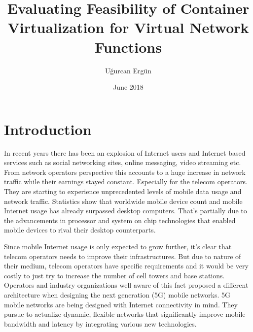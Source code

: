 \documentclass[12pt,oneandhalf,chaparabic,ceng,ms,eng,oneside,pntc]{gsufbe}
\author{Uğurcan Ergün}
\title{Evaluating Feasibility of Container Virtualization for Virtual Network Functions}
\date{June 2018}
\begin{document}
\addtolength{\textheight}{1.5cm}
\newlength\myindent
\setlength\myindent{6em}
\newcommand\bindent{%
  \begingroup
  \setlength{\itemindent}{\myindent}
  \addtolength{\algorithmicindent}{\myindent}
}
\newcommand\eindent{\endgroup}
\begin{preliminaries}

\end{preliminaries}
%
%
%
\newtheorem{thm}{Definition}[chapter]
\renewcommand{\thethm}{\arabic{chapter}.\arabic{thm}}
\newtheorem{prp}{Proposition}[chapter]
\renewcommand{\theprp}{\arabic{chapter}.\arabic{prp}}
\newenvironment{prf}{\noindent{\bf Proof}}{$\hfill \Box$ \vspace{10pt}}

\chapter{Introduction}
In recent years there has been an explosion of Internet users and Internet based services such as
social networking sites, online messaging, video streaming etc.  From network operators perspective this
accounts to a huge increase in network traffic while their earnings stayed constant.  Especially for the
telecom operators.  They are starting to experience unprecedented levels of mobile data usage and
network traffic.  Statistics show that worldwide mobile device count and mobile Internet usage has 
already surpassed desktop computers.  That's partially due to the advancements in processor and system
on chip technologies that enabled mobile devices to rival their desktop counterparts. 

Since mobile Internet usage is only expected to grow further, it's clear that telecom operators needs
to improve their infrastructures.  But due to nature of their medium, telecom operators have specific
requirements and it would be very costly to just try to increase the number of cell towers and base
stations.  Operators and industry organizations well aware of this fact proposed a different
architecture when designing the next generation (5G) mobile networks.  5G mobile networks are being
designed with Internet connectivity in mind.  They pursue to actualize dynamic, flexible networks that
significantly improve mobile bandwidth and latency by integrating various new technologies.
\end{document}
